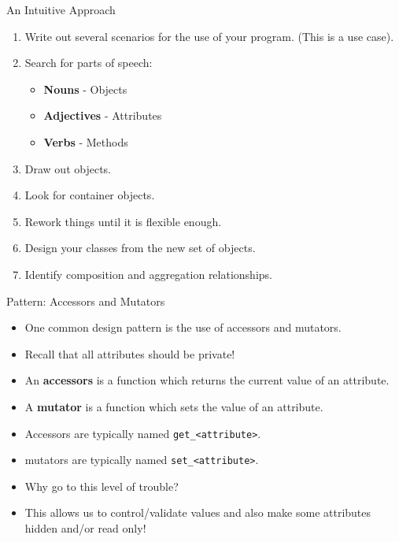 \documentclass[]{beamer}
\begin{document}
\begin{frame}{An Intuitive Approach}
    \begin{enumerate}[<+->]
        \item Write out several scenarios for the use of your program.
            (This is a use case).
        \item Search for parts of speech:
            \begin{itemize}
                \item \textbf{Nouns} - Objects
                \item \textbf{Adjectives} - Attributes
                \item \textbf{Verbs} - Methods
            \end{itemize}
        \item Draw out objects.
        \item Look for container objects.
        \item Rework things until it is flexible enough.
        \item Design your classes from the new set of objects.
        \item Identify composition and aggregation relationships.
    \end{enumerate}
\end{frame}

\begin{frame}{Pattern: Accessors and Mutators}
    \begin{itemize}[<+->]
        \item One common design pattern is the use of accessors and
            mutators.
        \item Recall that all attributes should be private!
        \item An \textbf{accessors} is a function which returns the
            current value of an attribute.  
        \item A \textbf{mutator} is a function which sets the value of
            an attribute.
        \item Accessors are typically named \texttt{get\_<attribute>}.
        \item mutators are typically named \texttt{set\_<attribute>}.
        \item Why go to this level of trouble?
        \item This allows us to control/validate values and also make
            some attributes hidden and/or read only!
    \end{itemize}
\end{frame}
\end{document}
